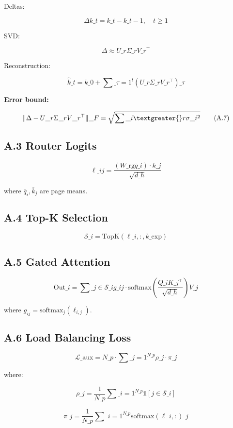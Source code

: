 Deltas:

\[
\Delta k\_t = k\_t - k\_{t-1}, \quad t \geq 1
\tag{A.4}
\]

SVD:

\[
\Delta \approx U\_r \Sigma\_r V\_r^\top
\tag{A.5}
\]

Reconstruction:

\[
\hat{k}\_t = k\_0 + \sum\_{\tau=1}^t (U\_r \Sigma\_r V\_r^\top)\_\tau
\tag{A.6}
\]

\textbf{Error bound:}

\[
\|\Delta - U\_r \Sigma\_r V\_r^\top\|\_F = \sqrt{\sum\_{i \textgreater{} r} \sigma\_i^2}
\tag{A.7}
\]

\subsection{A.3 Router Logits}

\[
\ell\_{ij} = \frac{(W\_\text{rg} \bar{q}\_i) \cdot \bar{k}\_j}{\sqrt{d\_h}}
\tag{A.8}
\]

where $\bar{q}_i, \bar{k}_j$ are page means.

\subsection{A.4 Top-K Selection}

\[
\mathcal{S}\_i = \text{TopK}(\ell\_{i, :}, k\_\text{exp})
\tag{A.9}
\]

\subsection{A.5 Gated Attention}

\[
\text{Out}\_i = \sum\_{j \in \mathcal{S}\_i} g\_{ij} \cdot \text{softmax}\!\left(\frac{Q\_i K\_j^\top}{\sqrt{d\_h}}\right) V\_j
\tag{A.10}
\]

where $g_{ij} = \text{softmax}_j(\ell_{i, j})$.

\subsection{A.6 Load Balancing Loss}

\[
\mathcal{L}\_\text{aux} = N\_p \cdot \sum\_{j=1}^{N\_p} \rho\_j \cdot \pi\_j
\tag{A.11}
\]

where:

\[
\rho\_j = \frac{1}{N\_p} \sum\_{i=1}^{N\_p} \mathbb{1}[j \in \mathcal{S}\_i]
\tag{A.12}
\]

\[
\pi\_j = \frac{1}{N\_p} \sum\_{i=1}^{N\_p} \text{softmax}(\ell\_{i, :})\_j
\tag{A.13}
\]

